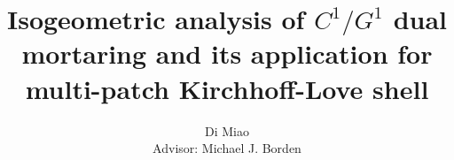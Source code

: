 \documentclass[preprint,12pt]{elsarticle}
\begin{document}
\graphicspath{{./img/}} 

\begin{frontmatter}


\title{Isogeometric analysis of $C^1/G^1$ dual mortaring and its application for multi-patch Kirchhoff-Love shell}




\author{Di Miao\\[1cm]{\small Advisor: Michael J. Borden}}
\address{Department of Civil and Environmental Engineering\\
Brigham Young University\\
368 CB, Provo, UT 84602, USA\\}





\end{frontmatter}
\end{document}
